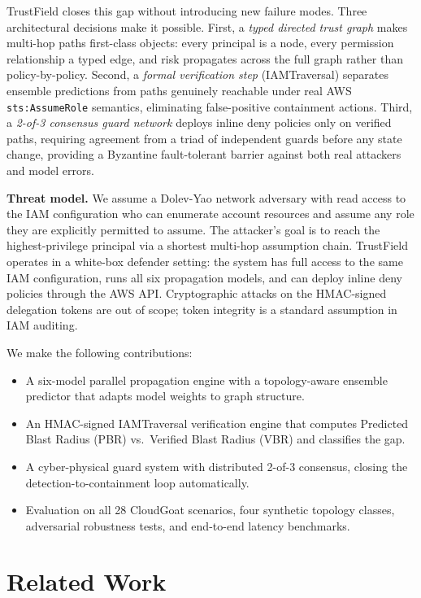 \documentclass[conference,a4paper]{IEEEtran}
\begin{document}
TrustField closes this gap without introducing new failure modes. Three
architectural decisions make it possible. First, a \emph{typed directed
trust graph} makes multi-hop paths first-class objects: every principal
is a node, every permission relationship a typed edge, and risk propagates
across the full graph rather than policy-by-policy. Second, a
\emph{formal verification step} (IAMTraversal) separates ensemble
predictions from paths genuinely reachable under real AWS
\texttt{sts:AssumeRole} semantics, eliminating false-positive containment
actions. Third, a \emph{2-of-3 consensus guard network} deploys inline
deny policies only on verified paths, requiring agreement from a triad of
independent guards before any state change, providing a Byzantine
fault-tolerant barrier against both real attackers and model errors.

\textbf{Threat model.}
We assume a Dolev-Yao network adversary with read access to the IAM
configuration who can enumerate account resources and assume any role
they are explicitly permitted to assume.
The attacker's goal is to reach the highest-privilege principal via a
shortest multi-hop assumption chain.
TrustField operates in a white-box defender setting: the system has
full access to the same IAM configuration, runs all six propagation
models, and can deploy inline deny policies through the AWS API.
Cryptographic attacks on the HMAC-signed delegation tokens are out of
scope; token integrity is a standard assumption in IAM auditing.

We make the following contributions:
\begin{itemize}
  \item A six-model parallel propagation engine with a topology-aware
        ensemble predictor that adapts model weights to graph structure.
  \item An HMAC-signed IAMTraversal verification engine that computes
        Predicted Blast Radius (PBR) vs.\ Verified Blast Radius (VBR)
        and classifies the gap.
  \item A cyber-physical guard system with distributed 2-of-3 consensus,
        closing the detection-to-containment loop automatically.
  \item Evaluation on all 28 CloudGoat scenarios, four synthetic topology
        classes, adversarial robustness tests, and end-to-end latency
        benchmarks.
\end{itemize}

\section{Related Work}
\end{document}
